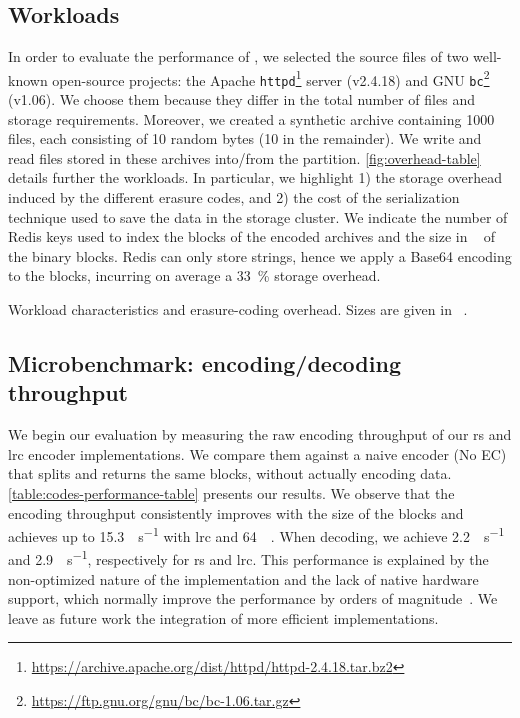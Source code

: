 \subsection{Workloads}
\label{sec:eval:workloads}
In order to evaluate the performance of \SYS, we selected the source files of two well-known open-source projects: the Apache \texttt{httpd}\footnote{\url{https://archive.apache.org/dist/httpd/httpd-2.4.18.tar.bz2}} server (v2.4.18) and GNU \texttt{bc}\footnote{\url{https://ftp.gnu.org/gnu/bc/bc-1.06.tar.gz}} (v1.06). 
We choose them because they differ in the total number of files and storage requirements.
Moreover, we created a synthetic archive containing 1000 files, each consisting of 10 random bytes (\SI{10}{\byte} in the remainder).
We write and read files stored in these archives into/from the \SYS partition. 
\autoref{fig:overhead-table} details further the workloads.
In particular, we highlight 1) the storage overhead induced by the different erasure codes, and 2) the cost of the serialization technique used to save the data in the storage cluster.
We indicate the number of Redis keys used to index the blocks of the encoded archives and the size in \si{\mega\byte} of the binary blocks. 
Redis can only store strings, hence we apply a Base64 encoding to the blocks, incurring on average a \SI{33}{\percent} storage overhead.

\begin{table}
    \centering
    \caption{Workload characteristics and erasure-coding overhead. Sizes are given in \si{\mega\byte}.}
    
    \label{fig:overhead-table}
\end{table}

\subsection{Microbenchmark: encoding/decoding throughput}%
\label{subsec:rw-perf}
We begin our evaluation by measuring the raw encoding throughput of our \ac{rs} and \ac{lrc} encoder implementations.
We compare them against a naive encoder (No EC) that splits and returns the same blocks, without actually encoding data.
\autoref{table:codes-performance-table} presents our results.  We observe that the encoding throughput consistently improves with the size of the blocks and achieves up to 15.3\si{\mega\byte\per\second} with \ac{lrc} and \SI{64}{\mega\byte}.
When decoding, we achieve 2.2\si{\mega\byte\per\second} and 2.9\si{\mega\byte\per\second}, respectively for \ac{rs} and \ac{lrc}.
This performance is explained by the non-optimized nature of the implementation and the lack of native hardware support, which normally improve the performance by orders of magnitude~\cite{Burihabwa2016}. We leave as future work the integration of more efficient implementations.

